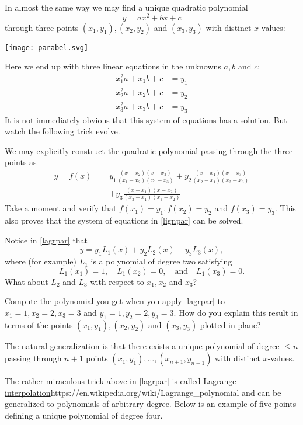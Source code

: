 \documentclass{article}
\begin{document}
In almost the same way we may find a unique quadratic polynomial
$$
y = a x^2 + b x + c
$$
through three points $(x_1, y_1), (x_2, y_2)$ and $(x_3, y_3)$ with distinct $x$-values:

\texttt{[image: parabel.svg]}


Here we end up with three linear equations in the unknowns $a, b$ and $c$:
\begin{align}\label{lignpar}
x_1^2 a + x_1 b + c &= y_1\\
x_2^2 a + x_2 b + c &= y_2\\
x_3^2 a + x_3 b + c &= y_3
\end{align}
It is not immediately obvious that this system of equations has a solution. But watch the following trick evolve.

We may explicitly construct the quadratic polynomial passing through the three points as
\begin{align}\label{lagrpar}
  y = f(x) = &y_1 \frac{(x - x_2)(x-x_3)}{(x_1 - x_2)(x_1-x_3)} + y_2 \frac{(x - x_1)(x - x_3)}{(x_2 - x_1)(x_2-x_3)}\\
  &+ y_3 \frac{(x - x_1)(x - x_2)}{(x_3 - x_1)(x_3-x_2)}
\end{align}
Take a moment and verify that $f(x_1) = y_1, f(x_2) = y_2$ and $f(x_3)= y_3$. This also proves that
the system of equations in \eqref{lignpar} can be solved.

\begin{remark}
Notice in \eqref{lagrpar} that
$$
y = y_1 L_1(x) + y_2 L_2(x) + y_3 L_3(x),
$$
where (for example)  $L_1$ is a polynomial of degree two satisfying
$$
L_1(x_1)=1,\quad L_1(x_2)=0, \quad\text{and}\quad L_1(x_3)=0.
$$ 
What about $L_2$ and $L_3$ with respect to $x_1, x_2$ and $x_3$?
\end{remark}

\beginshex\label{lagrcol}
Compute the polynomial you get when you apply \eqref{lagrpar} to $x_1 = 1, x_2 = 2, x_3= 3$ and
$y_1 = 1, y_2 = 2, y_3 = 3$. How do you explain this result in terms of the
points $(x_1, y_1), (x_2, y_2)$ and $(x_3, y_3)$ plotted in plane?
\endshex


The natural generalization is that there exists a unique polynomial of degree $\leq n$ passing through $n+1$ points
$(x_1, y_1), \dots, (x_{n+1}, y_{n+1})$ with distinct $x$-values.

The rather miraculous trick above in \eqref{lagrpar} is called \url{Lagrange interpolation}{https://en.wikipedia.org/wiki/Lagrange_polynomial} and can be generalized to polynomials of arbitrary degree.
Below is an example of five points defining a unique polynomial of degree four.
\end{document}
